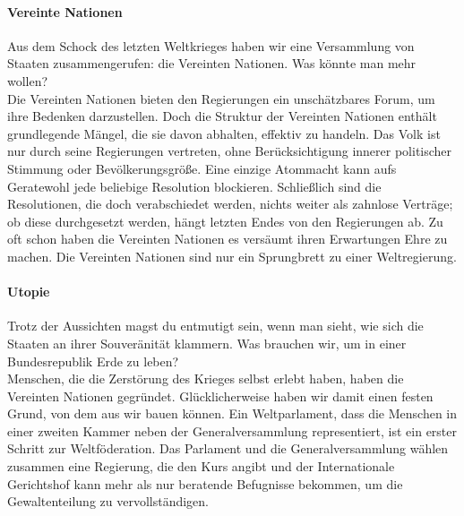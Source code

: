 \documentclass[11pt,a4paper]{article}
\begin{document}
\begin{multicols}{2}
\paragraph{Vereinte Nationen}

Aus dem Schock des letzten Weltkrieges haben wir eine Versammlung von Staaten zusammengerufen: die Vereinten Nationen. Was könnte man mehr wollen?\\
\noindent Die Vereinten Nationen bieten den Regierungen ein unschätzbares Forum, um ihre Bedenken darzustellen.
Doch die Struktur der Vereinten Nationen enthält grundlegende Mängel, die sie davon abhalten, effektiv zu handeln.
Das Volk ist nur durch seine Regierungen vertreten, ohne Berücksichtigung innerer politischer Stimmung oder Bevölkerungsgröße.
Eine einzige Atommacht kann aufs Geratewohl jede beliebige Resolution blockieren.
Schließlich sind die Resolutionen, die doch verabschiedet werden, nichts weiter als zahnlose Verträge; ob diese durchgesetzt werden, hängt letzten Endes von den Regierungen ab.
Zu oft schon haben die Vereinten Nationen es versäumt ihren Erwartungen Ehre zu machen.
Die Vereinten Nationen sind nur ein Sprungbrett zu einer Weltregierung.


\paragraph{Utopie}

Trotz der Aussichten magst du entmutigt sein, wenn man sieht, wie sich die Staaten an ihrer Souveränität klammern. Was brauchen wir, um in einer Bundesrepublik Erde zu leben?\\
\noindent Menschen, die die Zerstörung des Krieges selbst erlebt haben, haben die Vereinten Nationen gegründet. Glücklicherweise haben wir damit einen festen Grund, von dem aus wir bauen können.
Ein Weltparlament, dass die Menschen in einer zweiten Kammer neben der Generalversammlung representiert, ist ein erster Schritt zur Weltföderation.
Das Parlament und die Generalversammlung wählen zusammen eine Regierung, die den Kurs angibt und der Internationale Gerichtshof kann mehr als nur beratende Befugnisse bekommen, um die Gewaltenteilung zu vervollständigen.


\end{multicols}
\end{document}
